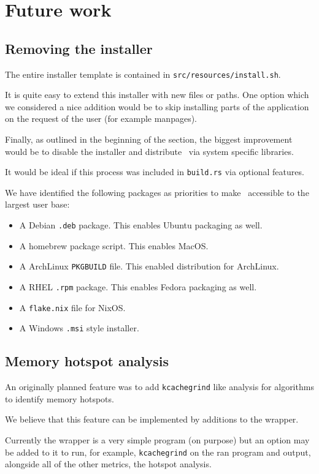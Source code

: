 \section{Future work}

\subsection{Removing the installer}

The entire installer template is contained in \texttt{src/resources/install.sh}.

It is quite easy to extend this installer with new files or paths. One option which
we considered a nice addition would be to skip installing parts of the application
on the request of the user (for example manpages).

Finally, as outlined in the beginning of the section, the biggest improvement
would be to disable the installer and distribute \gourd\ via system specific libraries.

It would be ideal if this process was included in \texttt{build.rs} via optional features.

We have identified the following packages as priorities to make \gourd\ accessible
to the largest user base:
\begin{itemize}
  \item A Debian \texttt{.deb} package. This enables Ubuntu packaging as well.
  \item A homebrew package script. This enables MacOS.
  \item A ArchLinux \texttt{PKGBUILD} file. This enabled distribution for ArchLinux.
  \item A RHEL \texttt{.rpm} package. This enables Fedora packaging as well.
  \item A \texttt{flake.nix} file for NixOS.
  \item A Windows \texttt{.msi} style installer.
\end{itemize}

\subsection{Memory hotspot analysis}

An originally planned feature was to add \texttt{kcachegrind} like analysis for
algorithms to identify memory hotspots.

We believe that this feature can be implemented by additions to the wrapper.

Currently the wrapper is a very simple program (on purpose) but an option may be
added to it to run, for example, \texttt{kcachegrind} on the ran program
and output, alongside all of the other metrics, the hotspot analysis.

